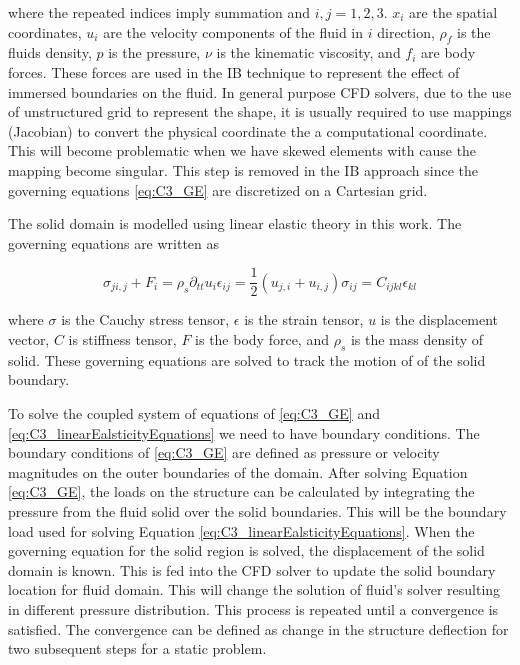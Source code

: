 where the repeated indices imply summation and $i,j=1,2,3$. $x_i$ are the spatial coordinates, $u_i$ are the velocity components of the fluid in $i$ direction, $\rho_f$ is the fluids density, $p$ is the pressure, $\nu$ is the kinematic viscosity, and $f_i$ are body forces. These forces are used in the IB technique to represent the effect of immersed boundaries on the fluid. In general purpose CFD solvers, due to the use of unstructured grid to represent the shape, it is usually required to use mappings (Jacobian) to convert the physical coordinate the a computational coordinate. This will become problematic when we have skewed elements with cause the mapping become singular. This step is removed in the IB approach since the governing equations \eqref{eq:C3_GE} are discretized on a Cartesian  grid.

The solid domain is modelled using linear elastic theory in this work. The governing equations are written as

\begin{subequations}\label{eq:C3_linearEalsticityEquations}
\begin{equation}
	\sigma_{ji,j} + F_i = \rho_s \partial_{tt} u_i
\end{equation}
\begin{equation}
	\epsilon_{ij} = \frac{1}{2} \left( u_{j,i} + u_{i,j} \right)
\end{equation}
\begin{equation}
	\sigma_{ij} = C_{ijkl} \epsilon_{kl}
\end{equation}
\end{subequations}

where $\sigma$ is the Cauchy stress tensor, $\epsilon$ is the strain tensor, $u$ is the displacement vector, $C$ is stiffness tensor, $F$ is the body force, and $\rho_s$ is the mass density of solid. These governing equations are solved to track the motion of of the solid boundary. 

To solve the coupled system of equations of \eqref{eq:C3_GE} and \eqref{eq:C3_linearEalsticityEquations} we need to have boundary conditions. The boundary conditions of \eqref{eq:C3_GE} are defined as pressure or velocity magnitudes on the outer boundaries of the domain. After solving Equation \eqref{eq:C3_GE}, the loads on the structure can be calculated by integrating the pressure from the fluid solid over the solid boundaries. This will be the boundary load used for solving Equation \eqref{eq:C3_linearEalsticityEquations}. When the governing equation for the solid region is solved, the displacement of the solid domain is known. This is fed into the CFD solver to update the solid boundary location for fluid domain. This will change the solution of fluid's solver resulting in different pressure distribution. This process is repeated until a convergence is satisfied. The convergence can be defined as change in the structure deflection for two subsequent steps for a static problem.

